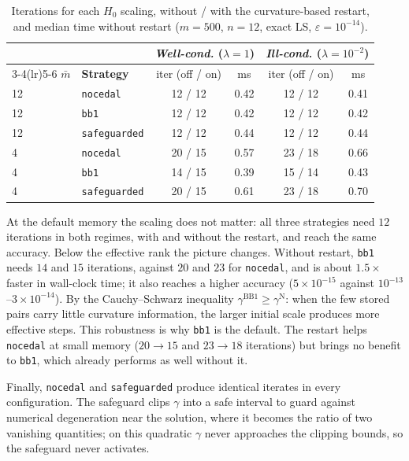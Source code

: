 \begin{table}[H]
\centering
\caption{Iterations for each $H_0$ scaling, without / with the
  curvature-based restart, and median time without restart
  ($m = 500$, $n = 12$, exact LS, $\varepsilon = 10^{-14}$).}
\label{tab:h0_scaling}
\small
\setlength{\tabcolsep}{7pt}
\begin{tabular}{llcccc}
    \toprule
    & & \multicolumn{2}{c}{\emph{Well-cond.} ($\lambda = 1$)}
      & \multicolumn{2}{c}{\emph{Ill-cond.} ($\lambda = 10^{-2}$)} \\
    \cmidrule(lr){3-4}\cmidrule(lr){5-6}
    $\bar{m}$ & \textbf{Strategy} & iter (off / on) & ms
                                  & iter (off / on) & ms \\
    \midrule
    12 & \texttt{nocedal}     & 12 / 12 & 0.42 & 12 / 12 & 0.41 \\
    12 & \texttt{bb1}         & 12 / 12 & 0.42 & 12 / 12 & 0.42 \\
    12 & \texttt{safeguarded} & 12 / 12 & 0.44 & 12 / 12 & 0.44 \\
    \midrule
    4  & \texttt{nocedal}     & 20 / 15 & 0.57 & 23 / 18 & 0.66 \\
    4  & \texttt{bb1}         & 14 / 15 & 0.39 & 15 / 14 & 0.43 \\
    4  & \texttt{safeguarded} & 20 / 15 & 0.61 & 23 / 18 & 0.70 \\
    \bottomrule
\end{tabular}
\end{table}

\noindent At the default memory the scaling does not matter: all three strategies
need $12$ iterations in both regimes, with and without the restart, and reach
the same accuracy. Below the effective rank the picture changes. Without
restart, \texttt{bb1} needs $14$ and $15$ iterations, against $20$ and $23$ for
\texttt{nocedal}, and is about $1.5\times$ faster in wall-clock time; it also
reaches a higher accuracy ($5 \times 10^{-15}$ against
$10^{-13}$--$3 \times 10^{-14}$). By the Cauchy--Schwarz inequality
$\gamma^{\mathrm{BB1}} \geq \gamma^{\mathrm{N}}$: when the few stored pairs
carry little curvature information, the larger initial scale produces more
effective steps. This robustness is why \texttt{bb1} is the default. The
restart helps \texttt{nocedal} at small memory ($20 \to 15$ and
$23 \to 18$ iterations) but brings no benefit to \texttt{bb1}, which already
performs as well without it.

\noindent Finally, \texttt{nocedal} and \texttt{safeguarded} produce identical
iterates in every configuration. The safeguard clips $\gamma$ into a safe
interval to guard against numerical degeneration near the solution, where it
becomes the ratio of two vanishing quantities; on this quadratic $\gamma$
never approaches the clipping bounds, so the safeguard never activates.


